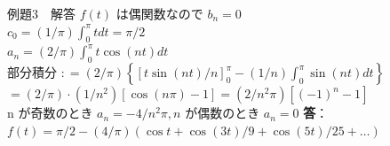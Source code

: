\documentclass[professionalfonts]{beamer}
\begin{document}
\begin{frame}{例題3　解答}
  $f(t)$ は偶関数なので $b_{n} = 0$\\[4pt]
  $c_{0} = (1/\pi) \int_{0}^{\pi} t dt = \pi/2$\\[4pt]
  $a_{n} = (2/\pi) \int_{0}^{\pi} t \cos(nt) dt$\\[4pt]
  部分積分 $: = (2/\pi)\left\{ [t \sin(nt)/n]_{0}^\pi - (1/n)\int_{0}^\pi \sin(nt) dt \right\}$\\[4pt]
  $= (2/\pi) \cdot (1/n^{2})[\cos(n\pi) - 1] = (2/n^{2}\pi)[(-1)^n - 1]$\\[4pt]
  n が奇数のとき $a_{n} = -4/n^{2}\pi, n$ が偶数のとき $a_{n} = 0$
  \medskip\textbf{答}：$f(t) = \pi/2 - (4/\pi)(\cos t + \cos(3t)/9 + \cos(5t)/25 + \ldots)$
\end{frame}
\end{document}
